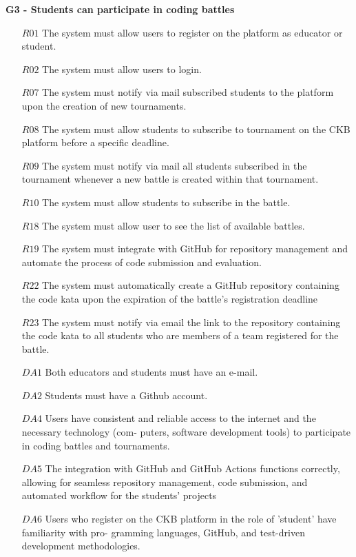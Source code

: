  \textbf{G3 -  Students can participate in coding battles}
\begin{itemize}
 \item [$R01$] The system must allow users to register on the platform as educator or student.
    \item [$R02$]The system must allow users to login.
    \item [$R07$]The system must notify via mail subscribed students to the platform upon the creation of new
tournaments.
    \item [$R08$]The system must allow students to subscribe to tournament on the CKB platform before a specific
deadline.
    \item [$R09$]The system must notify via mail all students subscribed in the tournament whenever a new battle
is created within that tournament.
    \item [$R10$]The system must allow students to subscribe in the battle.
    
    \item [$R18$]  The system must allow user to see the list of available battles.
    \item[$R19$]  The system must integrate with GitHub for repository management and automate the process of
code submission and evaluation.
\item [$R22$] The system must automatically create a GitHub repository containing the code kata upon the
expiration of the battle’s registration deadline
\item [$R23$] The system must notify via email the link to the repository containing the code kata to all students
who are members of a team registered for the battle.
    \item [$DA1$]Both educators and students must have an e-mail.
    \item [$DA2$] Students must have a Github account.
    \item [$DA4$]Users have consistent and reliable access to the internet and the necessary technology (com-
puters, software development tools) to participate in coding battles and tournaments.
    \item [$DA5$] The integration with GitHub and GitHub Actions functions correctly, allowing for seamless
repository management, code submission, and automated workflow for the students’ projects
    \item [$DA6$] Users who register on the CKB platform in the role of ’student’ have familiarity with pro-
gramming languages, GitHub, and test-driven development methodologies.
\end{itemize}
